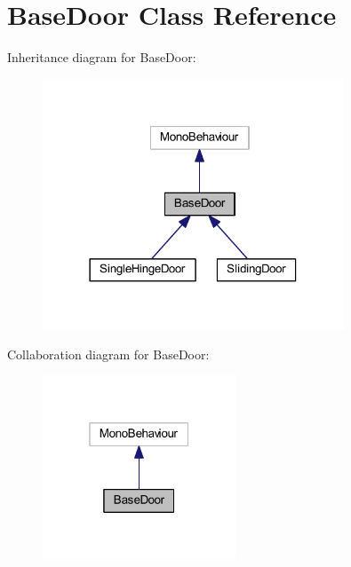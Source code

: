 \hypertarget{class_base_door}{}\section{Base\+Door Class Reference}
\label{class_base_door}


Inheritance diagram for Base\+Door\+:
\nopagebreak
\begin{figure}[H]
\begin{center}
\leavevmode
\includegraphics[width=254pt]{class_base_door__inherit__graph}
\end{center}
\end{figure}


Collaboration diagram for Base\+Door\+:
\nopagebreak
\begin{figure}[H]
\begin{center}
\leavevmode
\includegraphics[width=163pt]{class_base_door__coll__graph}
\end{center}
\end{figure}
